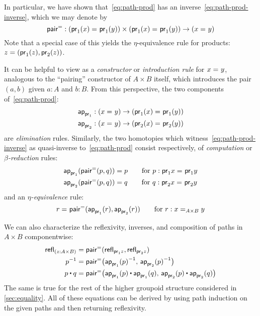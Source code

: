 In particular, we have shown that~\eqref{eq:path-prod} has an inverse~\eqref{eq:path-prod-inverse}, which we may denote by
\[
\pairpath : (\id{\proj{1}(x)}{\proj{1}(y)}) \times (\id{\proj{1}(x)}{\proj{1}(y)}) \to (\id x y)
\]
Note that a special case of this yields the $\eta$-equivalence rule for products: $z = (\proj1(z),\proj2(z))$.

It can be helpful to view \pairpath as a \emph{constructor} or \emph{introduction rule} for $\id x y$, analogous to the ``pairing'' constructor of $A\times B$ itself, which introduces the pair $(a,b)$ given $a:A$ and $b:B$.
From this perspective, the two components of~\eqref{eq:path-prod}:
\begin{align*}
  \projpath{1} &: (\id{x}{y}) \to (\id{\proj{1}(x)}{\proj{1} (y)})\\
  \projpath{2} &: (\id{x}{y}) \to (\id{\proj{2}(x)}{\proj{2} (y)})
\end{align*}
are \emph{elimination} rules.
Similarly, the two homotopies which witness~\eqref{eq:path-prod-inverse} as quasi-inverse to~\eqref{eq:path-prod} consist respectively, of \emph{computation} or \emph{$\beta$-reduction} rules:
\begin{align*}
  {\projpath{1}{(\pairpath(p, q)})}
  &= %
  {p} \qquad\text{for } p:\id{\proj{1} x}{\proj{1} y} \\
  {\projpath{2}{(\pairpath(p,q)})}
  &= %
  {q} \qquad\text{for } q:\id{\proj{2} x}{\proj{2} y}
\end{align*}
and an \emph{$\eta$-equivalence} rule:
\[
\id{r}{\pairpath(\projpath{1} (r), \projpath{2} (r)) }
\qquad\text{for } r : \id[A \times B] x y
\]

We can also characterize the reflexivity, inverses, and composition of paths in $A\times B$ componentwise:
\begin{align*}
  {\refl{(z : A \times B)}}
  &= {\pairpath (\refl{\proj{1} z},\refl{\proj{2} z})} \\
  {\opp{p}}
  &= {\pairpath \big(\opp{\projpath{1} (p)},\, \opp{\projpath{2} (p)}\big)} \\
  {{p \ct q}}
  &= {\pairpath \big({\projpath{1} (p)} \ct {\projpath{1} (q)},\,{\projpath{2} (p)} \ct {\projpath{2} (q)}\big)}
\end{align*}
The same is true for the rest of the higher groupoid structure considered in \autoref{sec:equality}.
All of these equations can be derived by using path induction on the given paths and then returning reflexivity.  


